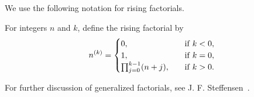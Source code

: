 We use the following notation for rising factorials.
\begin{definition}
  \label{def:rising-factorials}
  For integers $n$ and $k$, define the rising factorial by
  \begin{align*}
    n^{\left(k\right)} =
    \begin{cases}
      0, \quad & \mathrm{if \; } k < 0, \\
      1, \quad & \mathrm{if \; } k = 0, \\
      \prod_{j=0}^{k-1} (n+j), \quad & \mathrm{if \; } k>0.
    \end{cases}
  \end{align*}
\end{definition}
For further discussion of generalized factorials, see J. F. Steffensen~\cite{steffensen1933definition}.
